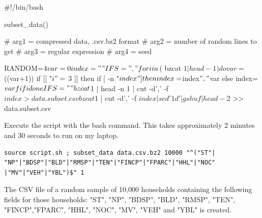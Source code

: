 \documentclass{llncs}\usepackage[]{graphicx}\usepackage[]{color}
\begin{document}
\noindent
\begin{boxedverbatim}
#!/bin/bash

subset_data()
{
# arg1 = compressed data, .csv.bz2 format
# arg2 = number of random lines to get
# arg3 = regular expression
# arg4 = seed

RANDOM=$4
var=0
index=""
IFS=","
for i in $( bzcat $1 | head -1 )
do
        var=$((var+1))
        if [[ "$i" =~ $3 ]]
        then
                if [ -n "$index" ]
                then
                        index=$index$","$var
                else
                        index=$var
                fi
        fi
done
IFS=" "
bzcat $1 | head -n 1 | cut -d',' -f $index > data.subset.csv
bzcat $1 | cut -d',' -f $index | sed '1d' | gshuf | head -$2 >>
data.subset.csv
}
\end{boxedverbatim}
\bigbreak
\noindent
Execute the script with the bash command. This takes approximately 2 minutes and 30 seconds to run on my laptop.
\begin{lstlisting}[frame=single] 
source script.sh ; subset_data data.csv.bz2 10000 "^("ST"|
"NP"|"BDSP"|"BLD"|"RMSP"|"TEN"|"FINCP"|"FPARC"|"HHL"|"NOC"
|"MV"|"VEH"|"YBL")$" 1
\end{lstlisting}
The CSV file of a random sample of 10,000 households containing the following fields for those households: "ST", "NP", "BDSP", "BLD", "RMSP", "TEN", "FINCP","FPARC", "HHL", "NOC", "MV", "VEH" and "YBL" is created.
\end{document}
